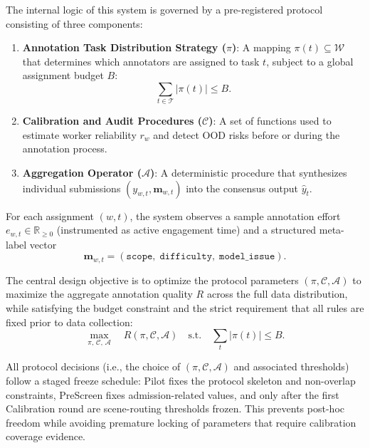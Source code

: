 The internal logic of this system is governed by a pre-registered protocol consisting of three components:
\begin{enumerate}
    \item \textbf{Annotation Task Distribution Strategy ($\pi$)}: A mapping $\pi(t) \subseteq \mathcal{W}$ that determines which annotators are assigned to task $t$, subject to a global assignment budget $B$:
    \begin{equation}
      \sum_{t\in\mathcal{T}}|\pi(t)| \le B.
    \end{equation}
    \item \textbf{Calibration and Audit Procedures ($\mathcal{C}$)}: A set of functions used to estimate worker reliability $r_w$ and detect OOD risks before or during the annotation process.
    \item \textbf{Aggregation Operator ($\mathcal{A}$)}: A deterministic procedure that synthesizes individual submissions $(y_{w,t}, \mathbf{m}_{w,t})$ into the consensus output $\hat{y}_t$.
\end{enumerate}

For each assignment $(w,t)$, the system observes a sample annotation effort $e_{w,t}\in\mathbb{R}_{\ge0}$ (instrumented as active engagement time) and a structured meta-label vector
\begin{equation}\label{eq:meta}
  \mathbf{m}_{w,t}=(\texttt{scope},\;\texttt{difficulty},\;\texttt{model\_issue}).
\end{equation}

The central design objective is to optimize the protocol parameters $(\pi, \mathcal{C}, \mathcal{A})$ to maximize the aggregate annotation quality $R$ across the full data distribution, while satisfying the budget constraint and the strict requirement that all rules are fixed prior to data collection:
\begin{equation}\label{eq:obj}
  \max_{\pi,\,\mathcal{C},\,\mathcal{A}}\quad R(\pi,\mathcal{C},\mathcal{A})\quad\text{s.t.}\quad
  \sum_{t}|\pi(t)|\le B.
\end{equation}

All protocol decisions (i.e., the choice of $(\pi,\mathcal{C},\mathcal{A})$ and associated thresholds) follow a staged freeze schedule: Pilot fixes the protocol skeleton and non-overlap constraints, PreScreen fixes admission-related values, and only after the first Calibration round are scene-routing thresholds frozen. This prevents post-hoc freedom while avoiding premature locking of parameters that require calibration coverage evidence.

